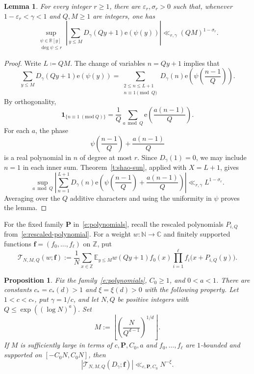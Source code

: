 \documentclass[12pt]{amsart}
\newcommand{\E}{\mathbb E}
\newcommand{\N}{\mathbb N}
\newcommand{\Z}{\mathbb Z}
\newcommand{\C}{\mathbb C}
\newcommand{\1}{\mathbf 1}
\newcommand{\e}{\mathrm e}
\newtheorem{proposition}[theorem]{Proposition}
\newtheorem{lemma}[theorem]{Lemma}
\begin{document}
\begin{lemma}\label{l:progression-phase}
For every integer $r\geq1$, there are $\varepsilon_r,\sigma_r>0$
such that, whenever $1-\varepsilon_r<\gamma<1$ and
$Q,M\geq1$ are integers, one has
\begin{equation}\label{e:progression-phase}
 \sup_{\substack{\psi\in\mathbb R[y]\\\deg\psi\leq r}}
 \left|\sum_{y\leq M}D_\gamma(Qy+1)\e(\psi(y))\right|
 \ll_{r,\gamma}(QM)^{1-\sigma_r}.
\end{equation}
\end{lemma}

\begin{proof}
Write $L\coloneqq QM$. The change of variables $n=Qy+1$ implies that  
\[
 \sum_{y\leq M}D_\gamma(Qy+1)\e(\psi(y))
 =
 \sum_{\substack{2\leq n\leq L+1\\n\equiv1\pmod Q}}
 D_\gamma(n)\e\!\left(\psi\!\left(\frac{n-1}{Q}\right)\right).
\]
By orthogonality,
\[
 \1_{\{n\equiv1\; (\mathrm{mod}\;Q)\}}
 =\frac1Q\sum_{a\bmod Q}\e\left(\frac{a(n-1)}Q\right).
\]
For each $a$, the phase
\[
 \psi\left(\frac{n-1}Q\right)+\frac{a(n-1)}Q
\]
is a real polynomial in $n$ of degree at most $r$.
Since $D_\gamma(1)=0$, we may include $n=1$ in each inner sum.
Theorem~\ref{t:shao-sun}, applied with $X=L+1$, gives
\[
 \sup_{a\bmod Q}
 \left|\sum_{n=1}^{L+1}D_\gamma(n)
 \e\!\left(\psi\!\left(\frac{n-1}{Q}\right)
 +\frac{a(n-1)}Q\right)\right|
 \ll_{r,\gamma}L^{1-\sigma_r}.
\]
Averaging over the $Q$ additive characters and using the
uniformity in $\psi$ proves the lemma.
\end{proof}


For the fixed family $\mathbf P$ in~\eqref{e:polynomials}, recall
the rescaled polynomials $P_{i,Q}$ from~\eqref{e:rescaled-polynomial}.
For a weight $w:\N\to\C$ and finitely supported functions
$\mathbf f=(f_0,\ldots,f_\ell)$ on $\Z$, put
\begin{equation}\label{e:counting-form}
 \mathcal T_{N,M,Q}(w;\mathbf f)
 :=\frac1N\sum_{x\in\Z}\E_{y\leq M}
 w(Qy+1)f_0(x)\prod_{i=1}^{\ell}
 f_i\bigl(x+P_{i,Q}(y)\bigr).
\end{equation}


\begin{proposition}
\label{p:comparison}
Fix the family~\eqref{e:polynomials}, $C_0\geq1$, and $0<a<1$.
There are constants $c_*=c_*(d)>1$ and $\xi=\xi(d)>0$
with the following property.
Let $1<c<c_*$, put $\gamma=1/c$, and let $N,Q$ be positive
integers with $Q\leq\exp((\log N)^a)$. Set
\[
 M:=\left\lfloor\left(\frac{N}{Q^{d-1}}\right)^{1/d}\right\rfloor.
\]
If $M$ is sufficiently large in terms of $c,\mathbf P,C_0,a$
and $f_0,\ldots,f_\ell$ are $1$-bounded and supported on
$[-C_0N,C_0N]$, then
\begin{equation}\label{e:comparison}
 \left|\mathcal T_{N,M,Q}(D_\gamma;\mathbf f)\right|
 \ll_{c,\mathbf P,C_0}N^{-\xi}.
\end{equation}
\end{proposition}
\end{document}
